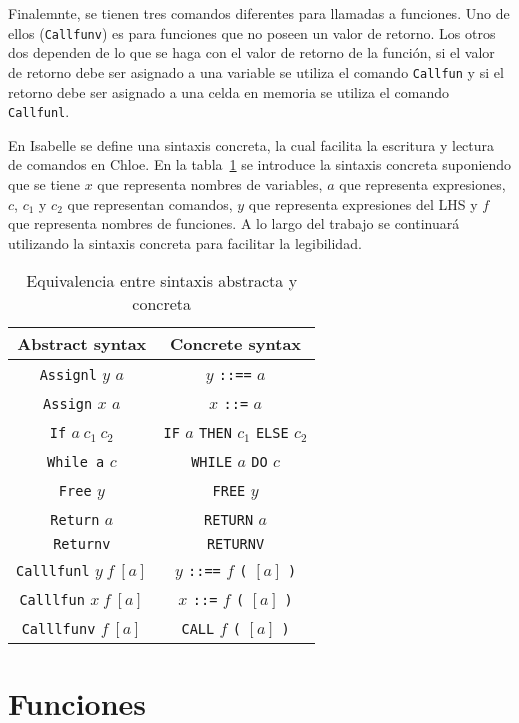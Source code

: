 Finalemnte, se tienen tres comandos diferentes para llamadas a funciones.
Uno de ellos (\verb|Callfunv|) es para funciones que no poseen un valor de retorno.
Los otros dos dependen de lo que se haga con el valor de retorno de la función, si el valor de retorno debe ser asignado a una variable se utiliza el comando \verb|Callfun| y si el retorno debe ser asignado a una celda en memoria se utiliza el comando \verb|Callfunl|.

En Isabelle se define una sintaxis concreta, la cual facilita la escritura y lectura de comandos en Chloe.
En la tabla~\ref{tab:concrete_syntax} se introduce la sintaxis concreta suponiendo que se tiene $x$ que representa nombres de variables, $a$ que representa expresiones, $c$, $c_1$ y $c_2$ que representan comandos, $y$ que representa expresiones del LHS y $f$ que representa nombres de funciones.
A lo largo del trabajo se continuará utilizando la sintaxis concreta para facilitar la legibilidad.

\begin{table}[h!]
\centering
\begin{tabular}{|c|c|}
  \hline
  \textbf{Abstract syntax} & \textbf{Concrete syntax} \\ [0.5ex]
  \hline \hline
  \verb|Assignl| $y$ $a$ & $y$ \verb|::==| $a$ \\
  \verb|Assign| $x$ $a$ & $x$ \verb|::=| $a$ \\
  \verb|If| $a\ c_{1}\ c_{2}$ & \verb|IF| $a$ \verb|THEN| $c_{1}$ \verb|ELSE| $c_{2}$ \\
  \verb|While a| $c$ & \verb|WHILE| $a$ \verb|DO| $c$ \\
  \verb|Free| $y$ & \verb|FREE| $y$ \\
  \verb|Return| $a$ & \verb|RETURN| $a$ \\
  \verb|Returnv| & \verb|RETURNV| \\
  \verb|Calllfunl| $y\ f\ [a]$ & $y$ \verb|::==| $f$ \verb|(| $[a]$ \verb|)| \\
  \verb|Calllfun| $x\ f\ [a]$ & $x$ \verb|::=| $f$ \verb|(| $[a]$ \verb|)| \\
  \verb|Calllfunv| $f\ [a]$ & \verb|CALL| $f$ \verb|(| $[a]$ \verb|)| \\
  \hline
\end{tabular}

\caption{Equivalencia entre sintaxis abstracta y concreta}
\label{tab:concrete_syntax}
\end{table}


\section{Funciones}\label{section:functions_commands}

